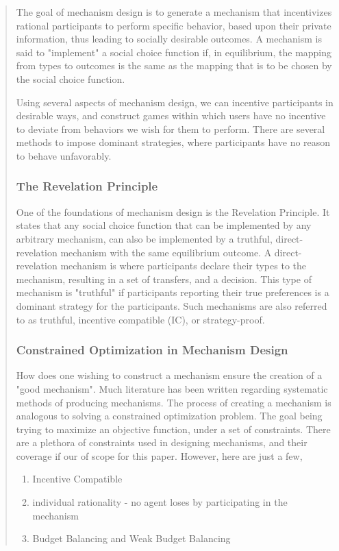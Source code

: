 \documentclass[12pt, titlepage, twocolumn]{report}
\begin{document}
\begin{quotation}
The goal of mechanism design is to generate a mechanism that incentivizes rational participants to perform specific behavior, based upon their private information, thus leading to socially desirable outcomes. A mechanism is said to "implement" a social choice function if, in equilibrium, the mapping from types to outcomes is the same as the mapping that is to be chosen by the social choice function. 

Using several aspects of mechanism design, we can incentive participants in desirable ways, and construct games within which users have no incentive to deviate from behaviors we wish for them to perform. There are several methods to impose dominant strategies, where participants have no reason to behave unfavorably.


\subsubsection{The Revelation Principle}
\indent
One of the foundations of mechanism design is the Revelation Principle. It states that any social choice function that can be implemented by any arbitrary mechanism, can also be implemented by a truthful, direct-revelation mechanism with the same equilibrium outcome. A direct-revelation mechanism is where participants declare their types to the mechanism, resulting in a set of transfers, and a decision. This type of mechanism is "truthful" if participants reporting their true preferences is a dominant strategy for the participants. Such mechanisms are also referred to as truthful, incentive compatible (IC), or strategy-proof. 


\subsubsection{Constrained Optimization in Mechanism Design}
\indent

How does one wishing to construct a mechanism ensure the creation of a "good mechanism". Much literature has been written regarding systematic methods of producing mechanisms. The process of creating a mechanism is analogous to solving a constrained optimization problem. The goal being trying to maximize an objective function, under a set of constraints. There are a plethora of constraints used in designing mechanisms, and their coverage if our of scope for this paper. However, here are just a few,

\begin{enumerate}
	\item Incentive Compatible
	\item individual rationality - no agent loses by participating in the mechanism
	\item Budget Balancing and Weak Budget Balancing
\end{enumerate}


\end{quotation}
\end{document}
